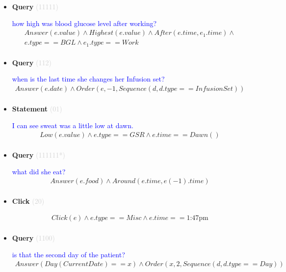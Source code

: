 \documentclass[11pt]{article}
\newcommand{\key}[1]{\textcolor{lightgray}{#1}}
\newcounter{CQuery}
\newcounter{CStatement}
\newcounter{CClick}
\begin{document}
\begin{itemize}
\item
\textbf{Query\theCQuery} \key{(11111)} \addtocounter{CQuery}{1}
\textcolor{blue}{ how high was blood glucose level after working? }
\begin{multline*}
Answer(e.value) \wedge Highest(e.value) \wedge After(e.time, e_1.time) \wedge \\ 
e.type==BGL \wedge e_1.type==Work \\ 
\end{multline*}


\item
\textbf{Query\theCQuery} \key{(112)} \addtocounter{CQuery}{1}
\textcolor{blue}{ when is the last time she changes her Infusion set? }
\begin{multline*}
Answer(e.date) \wedge Order(e, -1, Sequence(d, d.type==InfusionSet)) \\ 
\end{multline*}


\item
\textbf{Statement\theCStatement} \key{(01)} \addtocounter{CStatement}{1}
\textcolor{blue}{ I can see sweat was a little low at dawn. }
\begin{multline*}
Low(e.value) \wedge e.type==GSR \wedge e.time==Dawn() \\ 
\end{multline*}


\item
\textbf{Query\theCQuery} \key{(111111*)} \addtocounter{CQuery}{1}
\textcolor{blue}{ what did she eat? }
\begin{multline*}
Answer(e.food) \wedge Around(e.time, e(-1).time) \\ 
\end{multline*}


\item
\textbf{Click\theCClick} \key{(20)} \addtocounter{CClick}{1}
\textcolor{blue}{  }
\begin{multline*}
Click(e) \wedge e.type==Misc \wedge e.time==\mbox{1:47pm} \\ 
\end{multline*}


\item
\textbf{Query\theCQuery} \key{(1100)} \addtocounter{CQuery}{1}
\textcolor{blue}{ is that the second day of the patient? }
\begin{multline*}
Answer(Day(CurrentDate)==x) \wedge Order(x, 2, Sequence(d, d.type==Day)) \\ 
\end{multline*}



\end{itemize}
\end{document}
